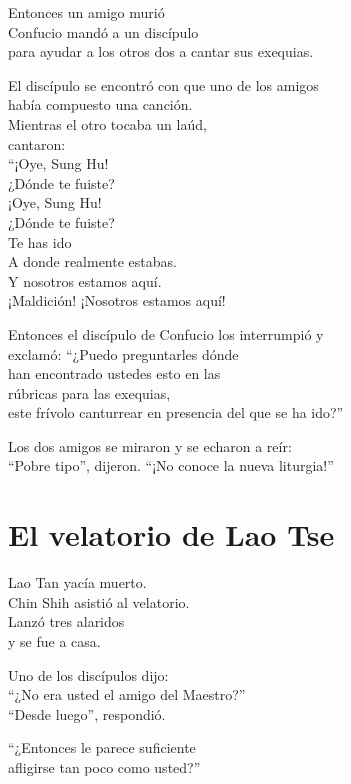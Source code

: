 \documentclass[hidelinks]{memoir}
\begin{document}
	Entonces un amigo murió\\
	Confucio mandó a un discípulo\\
	para ayudar a los otros dos a cantar sus exequias.
	
	El discípulo se encontró con que uno de los amigos\\
	había compuesto una canción.\\
	Mientras el otro tocaba un laúd,\\
	cantaron:\\
	``¡Oye, Sung Hu!\\
	¿Dónde te fuiste?\\
	¡Oye, Sung Hu!\\
	¿Dónde te fuiste?\\
	Te has ido\\
	A donde realmente estabas.\\
	Y nosotros estamos aquí.\\
	¡Maldición! ¡Nosotros estamos aquí!
	
	Entonces el discípulo de Confucio los interrumpió y\\
	exclamó: ``¿Puedo preguntarles dónde\\
	han encontrado ustedes esto en las\\
	rúbricas para las exequias,\\
	este frívolo canturrear en presencia del que se ha ido?''
	
	Los dos amigos se miraron y se echaron a reír:\\
	``Pobre tipo'', dijeron. ``¡No conoce la nueva liturgia!''
	
	\chapter*{El velatorio de Lao Tse}
	
	Lao Tan yacía muerto.\\
	Chin Shih asistió al velatorio.\\
	Lanzó tres alaridos\\
	y se fue a casa.
	
	Uno de los discípulos dijo:\\
	``¿No era usted el amigo del Maestro?''\\
	``Desde luego'', respondió.
	
	``¿Entonces le parece suficiente\\
	afligirse tan poco como usted?''
	
\end{document}
